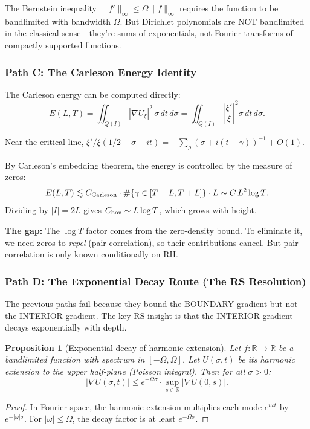 \documentclass[11pt]{article}
\newtheorem{proposition}[theorem]{Proposition}
\theoremstyle{definition}
\theoremstyle{remark}
\theoremstyle{definition}
\begin{document}
The Bernstein inequality $\|f'\|_\infty \le \Omega\|f\|_\infty$ requires the function to be bandlimited with bandwidth $\Omega$. But Dirichlet polynomials are NOT bandlimited in the classical sense---they're sums of exponentials, not Fourier transforms of compactly supported functions.

\subsubsection*{Path C: The Carleson Energy Identity}

The Carleson energy can be computed directly:
\[
  E(L,T) = \iint_{Q(I)} |\nabla U_\xi|^2\,\sigma\,dt\,d\sigma 
  = \iint_{Q(I)} \left|\frac{\xi'}{\xi}\right|^2 \sigma\,dt\,d\sigma.
\]

Near the critical line, $\xi'/\xi(1/2+\sigma+it) = -\sum_\rho (\sigma + i(t-\gamma))^{-1} + O(1)$.

By Carleson's embedding theorem, the energy is controlled by the measure of zeros:
\[
  E(L,T) \lesssim C_{\rm Carleson} \cdot \#\{\gamma \in [T-L, T+L]\} \cdot L \sim C\,L^2\log T.
\]
Dividing by $|I| = 2L$ gives $C_{\rm box} \sim L\log T$, which grows with height.

\textbf{The gap:} The $\log T$ factor comes from the zero-density bound. To eliminate it, we need zeros to \emph{repel} (pair correlation), so their contributions cancel. But pair correlation is only known conditionally on RH.

\subsubsection*{Path D: The Exponential Decay Route (The RS Resolution)}

The previous paths fail because they bound the BOUNDARY gradient but not the INTERIOR gradient. The key RS insight is that the INTERIOR gradient decays exponentially with depth.

\begin{proposition}[Exponential decay of harmonic extension]\label{prop:exponential-decay}
Let $f : \mathbb{R} \to \mathbb{R}$ be a bandlimited function with spectrum in $[-\Omega, \Omega]$. Let $U(\sigma, t)$ be its harmonic extension to the upper half-plane (Poisson integral). Then for all $\sigma > 0$:
\[
  |\nabla U(\sigma, t)| \le e^{-\Omega \sigma} \cdot \sup_{s \in \mathbb{R}} |\nabla U(0, s)|.
\]
\end{proposition}
\begin{proof}
In Fourier space, the harmonic extension multiplies each mode $e^{i\omega t}$ by $e^{-|\omega|\sigma}$. For $|\omega| \le \Omega$, the decay factor is at least $e^{-\Omega\sigma}$.
\end{proof}
\end{document}
